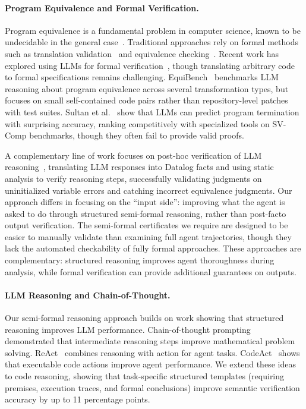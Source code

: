 \documentclass[]{meta}
\begin{document}
\paragraph{Program Equivalence and Formal Verification.}
Program equivalence is a fundamental problem in computer science, known to be undecidable in the general case~\cite{rice1953classes}.
Traditional approaches rely on formal methods such as translation validation~\cite{pnueli1998translation} and equivalence checking~\cite{necula2000translation}.
Recent work has explored using LLMs for formal verification~\cite{first2023baldur}, though translating arbitrary code to formal specifications remains challenging.
EquiBench~\cite{wei-etal-2025-equibench} benchmarks LLM reasoning about program equivalence across several transformation types, but focuses on small self-contained code pairs rather than repository-level patches with test suites.
Sultan et al.~\cite{sultan2026llmsversushaltingproblem} show that LLMs can predict program termination with surprising accuracy, ranking competitively with specialized tools on SV-Comp benchmarks, though they often fail to provide valid proofs.

A complementary line of work focuses on post-hoc verification of LLM reasoning~\cite{sistla2025verifiedcodereasoningllms}, translating LLM responses into Datalog facts and using static analysis to verify reasoning steps, successfully validating judgments on uninitialized variable errors and catching incorrect equivalence judgments.
Our approach differs in focusing on the ``input side'': improving what the agent is asked to do through structured semi-formal reasoning, rather than post-facto output verification. The semi-formal certificates we require are designed to be easier to manually validate than examining full agent trajectories, though they lack the automated checkability of fully formal approaches. These approaches are complementary: structured reasoning improves agent thoroughness during analysis, while formal verification can provide additional guarantees on outputs.

\paragraph{LLM Reasoning and Chain-of-Thought.}
Our semi-formal reasoning approach builds on work showing that structured reasoning improves LLM performance.
Chain-of-thought prompting~\cite{wei2022chain} demonstrated that intermediate reasoning steps improve mathematical problem solving. ReAct~\cite{yao2023react} combines reasoning with action for agent tasks. CodeAct~\cite{wang2024codeact} shows that executable code actions improve agent performance.
We extend these ideas to code reasoning, showing that task-specific structured templates (requiring premises, execution traces, and formal conclusions) improve semantic verification accuracy by up to 11 percentage points.
\end{document}
